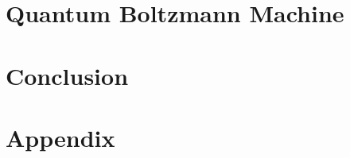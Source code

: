 \documentclass[11pt,twoside]{report}
\begin{document}
\chapter{Quantum Boltzmann Machine}
\label{ch:qbm}


\chapter{Conclusion}
\label{ch:conclusion}


\appendix
\chapter{Appendix}
\label{ch:appendix}


\printbibliography
\end{document}
